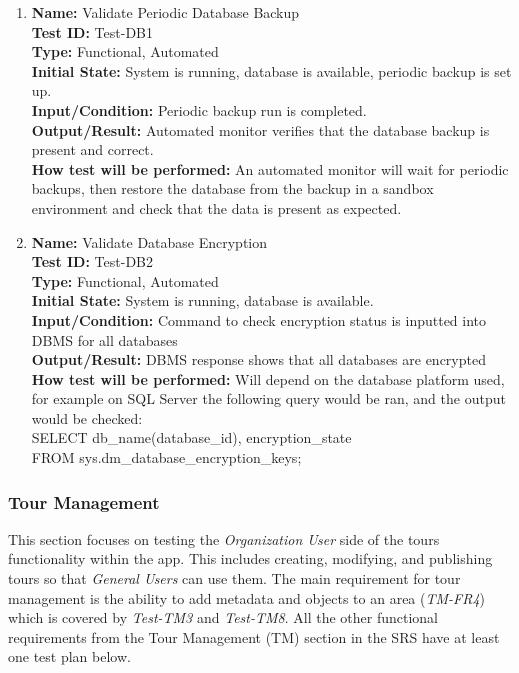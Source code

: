 \documentclass[12pt, titlepage]{article}
\begin{document}
\begin{enumerate}

\item \textbf{Name:} Validate Periodic Database Backup \label{itm:Test-DB1} \\
    \textbf{Test ID:} Test-DB1 \\
    \textbf{Type:} Functional, Automated \\
    \textbf{Initial State:} System is running, database is available, periodic backup is set up. \\
    \textbf{Input/Condition:} Periodic backup run is completed.  \\
    \textbf{Output/Result:} Automated monitor verifies that the database backup is present and correct.  \\
    \textbf{How test will be performed:} An automated monitor will wait for periodic backups, then restore the database from the backup in a sandbox environment and check that the data is present as expected.

\item \textbf{Name:} Validate Database Encryption \label{itm:Test-DB2} \\
    \textbf{Test ID:} Test-DB2 \\
    \textbf{Type:} Functional, Automated \\
    \textbf{Initial State:} System is running, database is available. \\
    \textbf{Input/Condition:} Command to check encryption status is inputted into DBMS for all databases \\
    \textbf{Output/Result:} DBMS response shows that all databases are encrypted \\
    \textbf{How test will be performed:} Will depend on the database platform used, for example on SQL Server the following query would be ran, and the output would be checked: \\
    SELECT db\_name(database\_id), encryption\_state \\
    FROM sys.dm\_database\_encryption\_keys;

\end{enumerate}

\subsubsection{Tour Management}

This section focuses on testing the \textit{Organization User} side of the tours functionality within the app. This includes creating, modifying, and publishing tours so that \textit{General Users} can use them. The main requirement for tour management is the ability to add metadata and objects to an area (\textit{TM-FR4}) which is covered by \textit{Test-TM3} and \textit{Test-TM8}. All the other functional requirements from the Tour Management (TM) section in the SRS \cite{SRS} have at least one test plan below.
\end{document}
